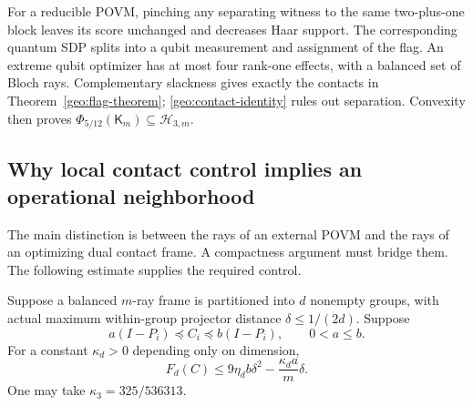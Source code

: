 For a reducible POVM, pinching any separating witness to the same
two-plus-one block leaves its score unchanged and decreases Haar
support. The corresponding quantum SDP splits into a qubit measurement
and assignment of the flag. An extreme qubit optimizer has at most
four rank-one effects, with a balanced set of Bloch rays.
Complementary slackness gives exactly the contacts in
Theorem~\ref{geo:flag-theorem}; \eqref{geo:contact-identity} rules out
separation. Convexity then proves
\(\Phi_{5/12}(\mathsf K_m)\subseteq\mathcal H_{3,m}\).

\subsection{Why local contact control implies an operational neighborhood}
\label{geo:op-proof}

The main distinction is between the rays of an external POVM and
the rays of an optimizing dual contact frame. A compactness argument
must bridge them. The following estimate supplies the required control.

\begin{lemma}
\label{geo:cusp}
Suppose a balanced \(m\)-ray frame is partitioned into \(d\) nonempty
groups, with actual maximum within-group projector distance
\(\delta\le1/(2d)\). Suppose
\[
 a(I-P_i)\preceq C_i\preceq b(I-P_i),\qquad 0<a\le b.
\]
For a constant \(\kappa_d>0\) depending only on dimension,
\begin{equation}
 F_d(C)\le9\eta_db\delta^2-\frac{\kappa_da}{m}\delta.
 \label{geo:negative-cusp}
\end{equation}
One may take \(\kappa_3=325/536313\).
\end{lemma}

